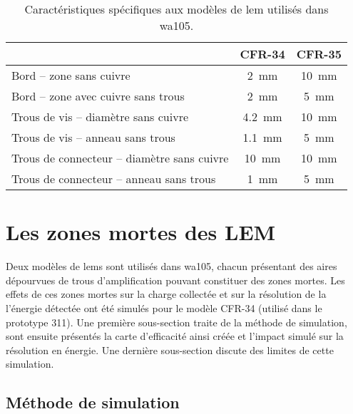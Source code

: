             \begin{table}
                \centering
                \begin{tabular}{|l|c|c|}
                    \hline
                     & CFR-34 & CFR-35\\
                    \hline
                    Bord -- zone sans cuivre & \SI{2}{\milli\meter} & \SI{10}{\milli\meter}\\
                    Bord -- zone avec cuivre sans trous & \SI{2}{\milli\meter} & \SI{5}{\milli\meter}\\
                    Trous de vis -- diamètre sans cuivre & \SI{4.2}{\milli\meter} & \SI{10}{\milli\meter} \\
                    Trous de vis -- anneau sans trous &  \SI{1.1}{\milli\meter} & \SI{5}{\milli\meter} \\
                    Trous de connecteur -- diamètre sans cuivre & \SI{10}{\milli\meter} & \SI{10}{\milli\meter} \\
                    Trous de connecteur -- anneau sans trous & \SI{1}{\milli\meter} & \SI{5}{\milli\meter} \\
                    \hline
                \end{tabular}
                \caption{Caractéristiques spécifiques aux modèles de \gls{lem} utilisés dans \gls{wa105}.\label{tab::lem_diff}}
            \end{table}
        
    \section{Les zones mortes des LEM}\label{sec::zones_mortes}
    
        Deux modèles de \glspl{lem} sont utilisés dans \gls{wa105}, chacun présentant des aires dépourvues de trous d'amplification pouvant constituer des zones mortes. Les effets de ces zones mortes sur la charge collectée et sur la résolution de la l'énergie détectée ont été simulés pour le modèle CFR-34 (utilisé dans le prototype 311). Une première sous-section traite de la méthode de simulation, sont ensuite présentés la carte d'efficacité ainsi créée et l'impact simulé sur la résolution en énergie. Une dernière sous-section discute des limites de cette simulation.
        
        \subsection{Méthode de simulation}
        
